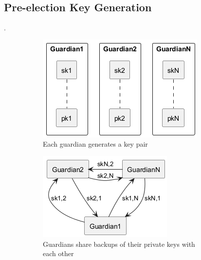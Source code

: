\subsection{Pre-election Key Generation}. 
\begin{figure}[h!]
    \centering
    \begin{subfigure}{0.3\textwidth}
        \centering
        \includegraphics[width=\textwidth]{abbildungen/Diagramme/keyceremony1.png}
        \caption{Each guardian generates a key pair}
        \label{fig:keypair}
    \end{subfigure}
    \hfill
    \begin{subfigure}{0.3\textwidth}
        \centering
        \includegraphics[width=\textwidth]{abbildungen/Diagramme/keyceremony2.png}
        \caption{Guardians share backups of their private keys with each other}
        \label{fig:backup}
    \end{subfigure}
    \hfill
    \begin{subfigure}{0.3\textwidth}

\end{subfigure}
\end{figure}
